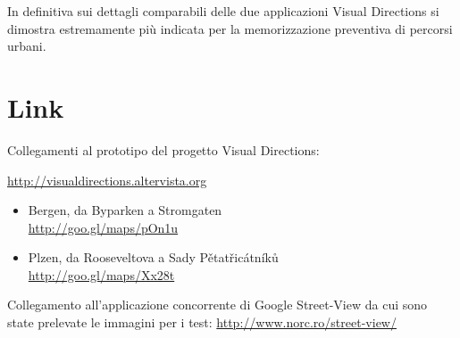 \documentclass[12pt,a4paper,openright, notitlepage]{report}
\begin{document}
In definitiva sui dettagli comparabili delle due applicazioni Visual Directions si dimostra estremamente più indicata per la memorizzazione preventiva di percorsi urbani.

\appendix

\chapter{Link}

Collegamenti al prototipo del progetto Visual Directions: 

\url{http://visualdirections.altervista.org}

\begin{itemize}
	\item Bergen, da Byparken a Stromgaten \\
	\url{http://goo.gl/maps/pOn1u}

	\item Plzen, da Rooseveltova a Sady Pětatřicátníků \\
	\url{http://goo.gl/maps/Xx28t}
\end{itemize}

Collegamento all’applicazione concorrente di Google Street-View da cui sono state prelevate le immagini per i test: \url{http://www.norc.ro/street-view/}




\nocite{*}

\end{document}
